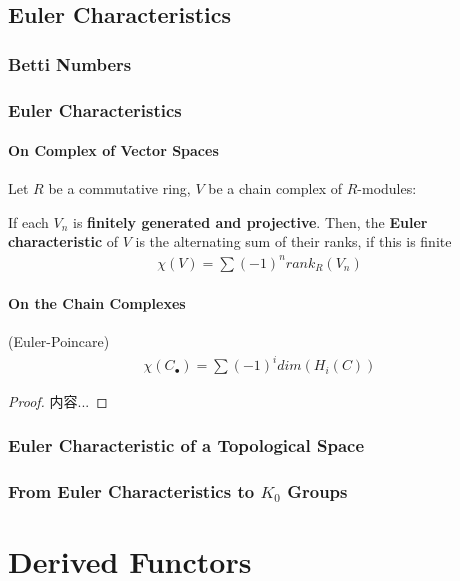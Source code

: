 \documentclass[Total.tex]{subfiles}
\begin{document}
		\section{Euler Characteristics}
			\subsection{Betti Numbers}
			\subsection{Euler Characteristics}
			\subsubsection{On Complex of Vector Spaces}
			\begin{Def}
				Let $R$ be a commutative ring, $V$ be a chain complex of $R$-modules:
				
				If each $V_n$ is \textbf{finitely generated and projective}. Then, the \textbf{Euler characteristic} of $V$ is the alternating sum of their ranks, if this is finite
				\begin{gather*}
					\chi(V)=\sum (-1)^n rank_R(V_n)
				\end{gather*}
		
			\end{Def}
				\subsubsection{On the Chain Complexes}
			\begin{theorem}
				(Euler-Poincare) 
				\begin{gather*}
					\chi(C_\bullet)=\sum (-1)^i dim(H_i(C))
				\end{gather*}
			\end{theorem}
			\begin{proof}
				内容...
			\end{proof}
			\subsection{Euler Characteristic of a Topological Space}
			\subsection{From Euler Characteristics to $K_0$ Groups}
	\chapter{Derived Functors}
\end{document}
